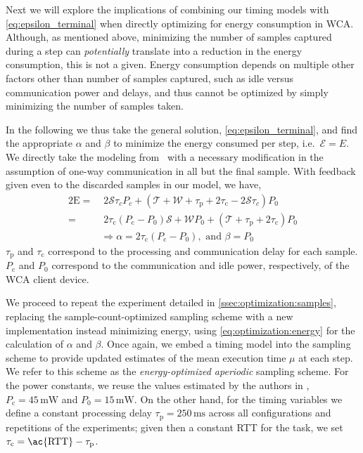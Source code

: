 Next we will explore the implications of combining our timing models with \cref{eq:epsilon_terminal} when directly optimizing for energy consumption in \ac{WCA}.
Although, as mentioned above, minimizing the number of samples captured during a step can \emph{potentially} translate into a reduction in the energy consumption, this is not a given.
Energy consumption depends on multiple other factors other than number of samples captured, such as idle versus communication power and delays, and thus cannot be optimized by simply minimizing the number of samples taken.

In the following we thus take the general solution, \cref{eq:epsilon_terminal}, and find the appropriate \( \alpha \) and \( \beta \) to minimize the energy consumed per step, i.e.\ \( \mathcal{E}=E \).
We directly take the modeling from~\cite{secAperiodic} with a necessary modification in the assumption of one-way communication in all but the final sample.
With feedback given even to the discarded samples in our model, we have, 
\begin{alignat}{2}
    \mathrm{E}=&\;2\mathcal{S}\tau_cP_c+(\mathcal{T}+\mathcal{W}+\tau_\mathrm{p}+2\tau_\mathrm{c}-2\mathcal{S}\tau_c)P_0\nonumber\\
    =&\;2\tau_{\text{c}}(P_{\text{c}} -P_0)\mathcal{S}+\mathcal{W}P_0+(\mathcal{T}+\tau_{\text{p}} +2\tau_{\text{c}}) P_0\nonumber\\
&\Rightarrow \alpha=2\tau_{\text{c}}(P_{\text{c}} -P_0),\text{ and }\beta=P_0 \label{eq:optimization:energy}
\end{alignat}
\( \tau_\text{p} \) and \( \tau_\text{c} \) correspond to the processing and communication delay for each sample.
\( P_\text{c} \) and \( P_0 \) correspond to the communication and idle power, respectively, of the \ac{WCA} client device.

We proceed to repeat the experiment detailed in \cref{ssec:optimization:samples}, replacing the sample-count-optimized sampling scheme with a new implementation instead minimizing energy, using \cref{eq:optimization:energy} for the calculation of \( \alpha \) and \( \beta \).
Once again, we embed a timing model into the sampling scheme to provide updated estimates of the mean execution time \( \mu \) at each step.
We refer to this scheme as the \emph{energy-optimized aperiodic} sampling scheme.
For the power constants, we reuse the values estimated by the authors in \textcite{TMCperiodic}, \( P_\text{c} = 45\,\si{\milli\watt} \) and \( P_\text{0} = 15\,\si{\milli\watt} \).
On the other hand, for the timing variables we define a constant processing delay \( \tau_\text{p} = 250\,\si{\milli\second} \) across all configurations and repetitions of the experiments; given then a constant \ac{RTT} for the task, we set \( \tau_\text{c} = \text{\ac{RTT}} - \tau_\text{p} \).

